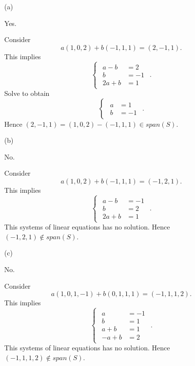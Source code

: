 \begin{Exercise}
	\begin{enumerate}[(a)]
		\item[(a)]
		\begin{answer}
			Yes.
		\end{answer}
		\begin{solution}
			Consider
			$$
			a(1,0,2)+b(-1,1,1) = (2,-1,1).
			$$
			This implies
			$$
			\begin{cases}
			\begin{aligned}
			a-b &= 2 \\
			b &= -1 \\
			2a+b &= 1
			\end{aligned}
			\end{cases}.
			$$
			Solve to obtain
			$$
			\begin{cases}
			\begin{aligned}
			a &= 1 \\
			b &= -1
			\end{aligned}
			\end{cases}.
			$$
			Hence $(2,-1,1) = (1,0,2)-(-1,1,1) \in span(S)$.
		\end{solution}
		
		\item[(b)]
		\begin{answer}
			No.
		\end{answer}
		\begin{solution}
			Consider
			$$
			a(1,0,2)+b(-1,1,1) = (-1,2,1).
			$$
			This implies
			$$
			\begin{cases}
			\begin{aligned}
			a-b &= -1 \\
			b &= 2 \\
			2a+b &= 1
			\end{aligned}
			\end{cases}.
			$$
			This systems of linear equations has no solution. Hence $(-1,2,1)\notin span(S)$.
		\end{solution}
		
		\item[(c)]
		\begin{answer}
			No.
		\end{answer}
		\begin{solution}
			Consider
			$$
			a(1,0,1,-1)+b(0,1,1,1) = (-1,1,1,2).
			$$
			This implies
			$$
			\begin{cases}
			\begin{aligned}
			a &= -1 \\
			b &= 1 \\
			a+b &= 1 \\
			-a+b &= 2
			\end{aligned}
			\end{cases}.
			$$
			This systems of linear equations has no solution. Hence $(-1,1,1,2)\notin span(S)$.
		\end{solution}
		

\end{enumerate}
\end{Exercise}
